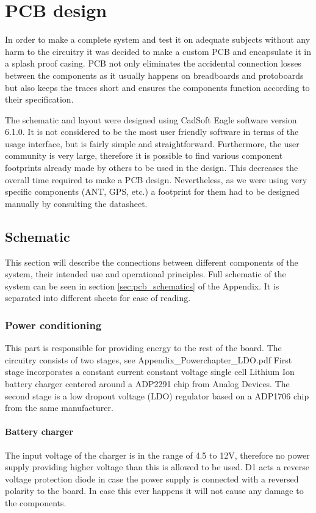 \chapter{PCB design}
In order to make a complete system and test it on adequate subjects without any harm to the circuitry it was decided to make a custom PCB and encapsulate it in a splash proof casing. PCB not only eliminates the accidental connection losses between the components as it usually happens on breadboards and protoboards but also keeps the traces short and ensures the components function according to their specification.
 
The schematic and layout were designed using CadSoft Eagle software version 6.1.0. It is not considered to be the most user friendly software in terms of the usage interface, but is fairly simple and straightforward. Furthermore, the user community is very large, therefore it is possible to find various component footprints already made by others to be used in the design. This decreases the overall time required to make a PCB design. Nevertheless, as we were using very specific components  (ANT, GPS, etc.) a footprint for them had to be designed manually by consulting the datasheet. 


\section{Schematic}
This section will describe the connections between different components of the system, their intended use and operational principles. Full schematic of the system can be seen in section \ref{sec:pcb_schematics} of the Appendix. It is separated into different sheets for ease of reading.

\subsection{Power conditioning}
This part is responsible for providing energy to the rest of the board. The circuitry consists of two stages, see \TODO{}Appendix\_Powerchapter\_LDO.pdf First stage incorporates a constant current constant voltage single cell Lithium Ion battery charger centered around a ADP2291 chip from Analog Devices. The second stage is a low dropout voltage (LDO) regulator based on a ADP1706 chip from the same manufacturer.



\subsubsection{Battery charger}
The input voltage of the charger is in the range of 4.5 to 12V, therefore no power supply providing higher voltage than this is allowed to be used. D1 acts a reverse voltage protection diode in case the power supply is connected with a reversed polarity to the board. In case this ever happens it will not cause any damage to the components. 


